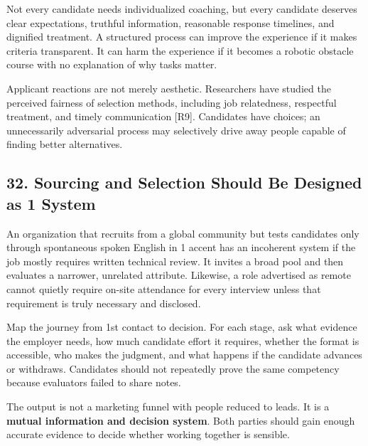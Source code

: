 Not every candidate needs individualized coaching, but every candidate deserves clear expectations, truthful information, reasonable response timelines, and dignified treatment. A structured process can improve the experience if it makes criteria transparent. It can harm the experience if it becomes a robotic obstacle course with no explanation of why tasks matter.

Applicant reactions are not merely aesthetic. Researchers have studied the perceived fairness of selection methods, including job relatedness, respectful treatment, and timely communication [R9]. Candidates have choices; an unnecessarily adversarial process may selectively drive away people capable of finding better alternatives.

\subsection*{32. Sourcing and Selection Should Be Designed as 1 System}

An organization that recruits from a global community but tests candidates only through spontaneous spoken English in 1 accent has an incoherent system if the job mostly requires written technical review. It invites a broad pool and then evaluates a narrower, unrelated attribute. Likewise, a role advertised as remote cannot quietly require on-site attendance for every interview unless that requirement is truly necessary and disclosed.

Map the journey from 1st contact to decision. For each stage, ask what evidence the employer needs, how much candidate effort it requires, whether the format is accessible, who makes the judgment, and what happens if the candidate advances or withdraws. Candidates should not repeatedly prove the same competency because evaluators failed to share notes.

The output is not a marketing funnel with people reduced to leads. It is a \textbf{mutual information and decision system}. Both parties should gain enough accurate evidence to decide whether working together is sensible.
